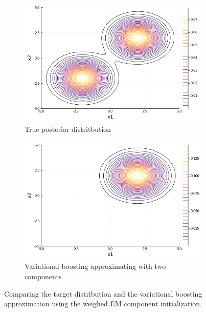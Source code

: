 \begin{figure}[H]
\centering
\begin{subfigure}{0.45\textwidth}
\includegraphics[width=1\linewidth]{../../plot/true_post_far.png}
\caption{True posterior distritbution}
\end{subfigure}
\begin{subfigure}{0.45\textwidth}
\includegraphics[width=1\linewidth]{../../plot/approx_post_far.png}
\caption{Variational boosting approximating with two components}
\end{subfigure}
\caption{Comparing the target distribution and the variational boosting approximation using the weighed EM component initialization.}
\label{fig:fail}
\end{figure}


